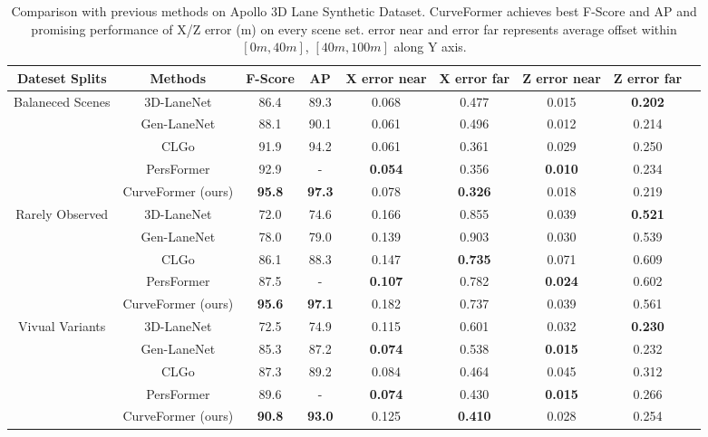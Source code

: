 \documentclass[letterpaper, 10 pt, conference]{ieeeconf}
\begin{document}
\begin{table*}[t]
\centering
\begin{scriptsize}
    \caption{Comparison with previous methods on Apollo 3D Lane Synthetic Dataset. CurveFormer achieves best F-Score and AP and promising performance of X/Z error (m) on every scene set. error near and error far represents average offset within $[0m,40m]$, $[40m, 100m]$ along Y axis.}
    \label{tab:results-apollosim}
    \begin{tabular}{c|c|ccccccc}
    \toprule
    Dateset Splits & Methods & F-Score & AP & X error near & X error far & Z error near & Z error far \\
      \midrule
      \multicolumn{1}{c|}{\multirow{5}{5em}{Balaneced Scenes}}
     & 3D-LaneNet\cite{garnett20193d}   & 86.4 & 89.3 & 0.068 & 0.477 & 0.015 &  \textbf{0.202} \\
     & Gen-LaneNet\cite{guo2020gen}  & 88.1 & 90.1 & 0.061 & 0.496 & 0.012 & 0.214 \\
     & CLGo\cite{liu2022learning}         & 91.9 & 94.2 & 0.061 & 0.361 & 0.029 & 0.250 \\
     & PersFormer\cite{chen2022persformer}   & 92.9 & - &  \textbf{0.054} & 0.356 &  \textbf{0.010} & 0.234 \\
     & CurveFormer (ours) &  \textbf{95.8} &  \textbf{97.3} & 0.078 &  \textbf{0.326} & 0.018 & 0.219 \\
      \midrule
      \multicolumn{1}{c|}{\multirow{5}{5em}{Rarely Observed}} 
      & 3D-LaneNet\cite{garnett20193d}   & 72.0 & 74.6 & 0.166 & 0.855 & 0.039 & \textbf{0.521} \\
      & Gen-LaneNet\cite{guo2020gen}  & 78.0 & 79.0 & 0.139 & 0.903 & 0.030 & 0.539 \\
      & CLGo\cite{liu2022learning}         & 86.1 & 88.3 & 0.147 & \textbf{0.735} & 0.071 & 0.609 \\
      & PersFormer\cite{chen2022persformer}   & 87.5 & - & \textbf{0.107} & 0.782 & \textbf{0.024} & 0.602 \\
      & CurveFormer (ours)         & \textbf{95.6} & \textbf{97.1} & 0.182 & 0.737 & 0.039 & 0.561 &  \\
      \midrule
      \multicolumn{1}{c|}{\multirow{5}{5em}{Vivual Variants}} 
      & 3D-LaneNet\cite{garnett20193d}   & 72.5 & 74.9 & 0.115 & 0.601 & 0.032 & \textbf{0.230} \\
      & Gen-LaneNet\cite{guo2020gen}  & 85.3 & 87.2 & \textbf{0.074} & 0.538 & \textbf{0.015} & 0.232 \\
      & CLGo\cite{liu2022learning}         & 87.3 & 89.2 & 0.084 & 0.464 & 0.045 & 0.312 \\
      & PersFormer\cite{chen2022persformer}   & 89.6 & - & \textbf{0.074} & 0.430 & \textbf{0.015} & 0.266 \\
      & CurveFormer (ours)         & \textbf{90.8} & \textbf{93.0} & 0.125 & \textbf{0.410} & 0.028 & 0.254 &  \\
      \bottomrule
    \end{tabular}
\end{scriptsize}
\end{table*}
\end{document}
